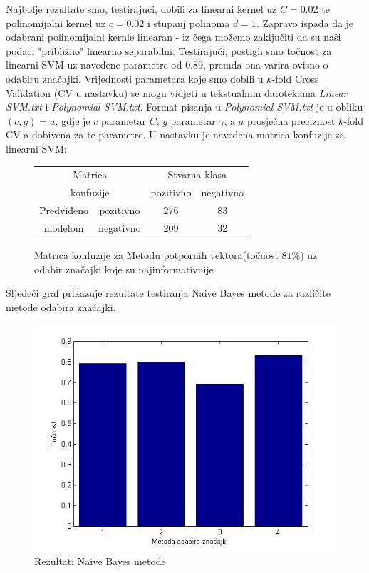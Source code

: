 \documentclass[conference]{IEEEtran}
\begin{document}
Najbolje rezultate smo, testirajući, dobili za linearni kernel uz $C=0.02$ te polinomijalni kernel uz $c=0.02$ i stupanj polinoma $d=1$. Zapravo ispada da je odabrani polinomijalni kernle linearan - iz čega možemo zaključiti da su naši podaci "približno" linearno separabilni. Testirajući, postigli smo točnost za linearni SVM uz navedene parametre od $0.89$, premda ona varira ovisno o odabiru značajki. Vrijednosti parametara koje smo dobili u $k$-fold  Cross Validation (CV u nastavku) se mogu vidjeti u tekstualnim datotekama \textit{Linear SVM.txt} i \textit{Polynomial SVM.txt}. Format pisanja u \textit{Polynomial SVM.txt} je u obliku $(c,g)=a$, gdje je $c$ parametar $C$, $g$ parametar $\gamma$, a $a$ prosječna preciznost $k$-fold CV-a dobivena za te parametre. U nastavku je navedena matrica konfuzije za linearni SVM:
\begin{figure}[!ht]
\begin{minipage}{0.5\textwidth}
\centering
\begin{tabular}{|c|c|c|c|}
  \hline
  \multicolumn{2}{|c|}{Matrica}  & \multicolumn{2}{|c|}{Stvarna klasa} \\ 
  \cline{3-4}
  \multicolumn{2}{|c|}{konfuzije} & pozitivno & negativno \\ 
  \hline
  Predviđeno & pozitivno & 276 & 83 \\
  \cline{2-4}
  modelom & negativno & 209 & 32 \\
  \hline
\end{tabular}
\caption{Matrica konfuzije za Metodu potpornih vektora(točnost $81\%$) uz odabir značajki koje su najinformativnije}
\end{minipage}
\end{figure}


Sljedeći graf prikazuje rezultate testiranja Naive Bayes metode za različite metode odabira značajki.

\begin{figure}[!ht]
\begin{minipage}{0.5\textwidth}
\centering
\includegraphics[width=\textwidth]{images/bayes.jpg}
\caption{Rezultati Naive Bayes metode}
\end{minipage}
\end{figure}
\end{document}
